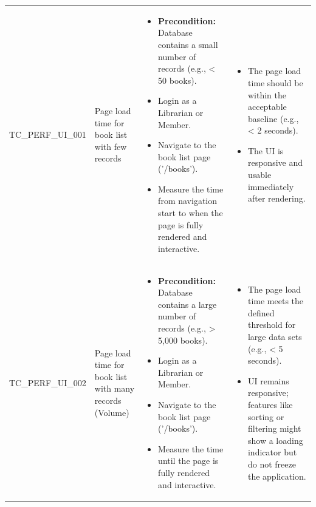 \documentclass[10pt, a4paper]{report}
\begin{document}
\begin{longtable}{|>{\raggedright\arraybackslash}p{3.5cm}|>{\raggedright\arraybackslash}p{4cm}|>{\raggedright\arraybackslash}p{5cm}|>{\raggedright\arraybackslash}p{5.5cm}|}
\multicolumn{4}{|l|}{\textbf{Sub-Section: UI Load \& Responsiveness Testing}} \\ \hline
TC\_PERF\_UI\_001 & Page load time for book list with few records & 
    \begin{itemize}[noitemsep, topsep=0pt, partopsep=0pt, leftmargin=*]
        \item \textbf{Precondition:} Database contains a small number of records (e.g., < 50 books).
        \item Login as a Librarian or Member.
        \item Navigate to the book list page ('/books').
        \item Measure the time from navigation start to when the page is fully rendered and interactive.
    \end{itemize} & 
    \begin{itemize}[noitemsep, topsep=0pt, partopsep=0pt, leftmargin=*]
        \item The page load time should be within the acceptable baseline (e.g., < 2 seconds).
        \item The UI is responsive and usable immediately after rendering.
    \end{itemize} \\ \hline
TC\_PERF\_UI\_002 & Page load time for book list with many records (Volume) & 
    \begin{itemize}[noitemsep, topsep=0pt, partopsep=0pt, leftmargin=*]
        \item \textbf{Precondition:} Database contains a large number of records (e.g., > 5,000 books).
        \item Login as a Librarian or Member.
        \item Navigate to the book list page ('/books').
        \item Measure the time until the page is fully rendered and interactive.
    \end{itemize} & 
    \begin{itemize}[noitemsep, topsep=0pt, partopsep=0pt, leftmargin=*]
        \item The page load time meets the defined threshold for large data sets (e.g., < 5 seconds).
        \item UI remains responsive; features like sorting or filtering might show a loading indicator but do not freeze the application.
    \end{itemize} \\ \hline

\end{longtable}
\end{document}
